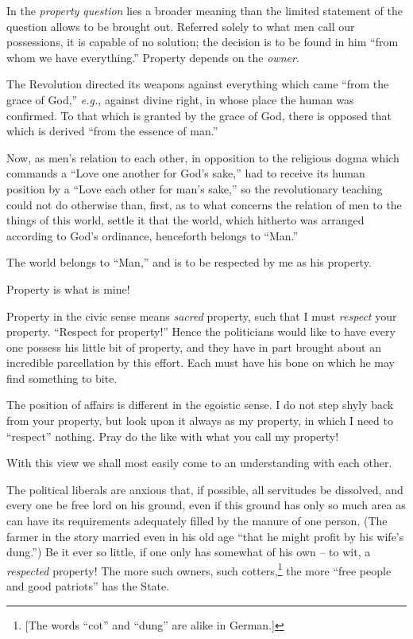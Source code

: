 \documentclass[12pt,a4paper]{book}
\begin{document}
In the \textit{property question} lies a broader meaning than the limited 
statement of the question allows to be brought out. Referred solely to what 
men call our possessions, it is capable of no solution; the decision is to be 
found in him ``from whom we have everything.'' Property depends on the 
\textit{owner}.

The Revolution directed its weapons against everything which came ``from the 
grace of God,'' \textit{e.g.}, against divine right, in whose place the 
human was confirmed. To that which is granted by the grace of God, there is 
opposed that which is derived ``from the essence of man.''

Now, as men's relation to each other, in opposition to the religious dogma 
which commands a ``Love one another for God's sake,'' had to receive its 
human position by a ``Love each other for man's sake,'' so the revolutionary 
teaching could not do otherwise than, first, as to what concerns the relation 
of men to the things of this world, settle it that the world, which hitherto 
was arranged according to God's ordinance, henceforth belongs to ``Man.''

The world belongs to ``Man,'' and is to be respected by me as his property.

Property is what is mine!

Property in the civic sense means \textit{sacred} property, such that I must 
\textit{respect} your property. ``Respect for property!'' Hence the 
politicians would like to have every one possess his little bit of property, 
and they have in part brought about an incredible parcellation by this effort. 
Each must have his bone on which he may find something to bite.

The position of affairs is different in the egoistic sense. I do not step 
shyly back from your property, but look upon it always as my property, in 
which I need to ``respect'' nothing. Pray do the like with what you call my 
property!

With this view we shall most easily come to an understanding with each other.

The political liberals are anxious that, if possible, all servitudes be 
dissolved, and every one be free lord on his ground, even if this ground has 
only so much area as can have its requirements adequately filled by the manure 
of one person. (The farmer in the story married even in his old age ``that he 
might profit by his wife's dung.'') Be it ever so little, if one only has 
somewhat of his own -- to wit, a \textit{respected} property! The more such 
owners, such cotters,\footnote{[The words ``cot'' and ``dung'' are alike 
in German.]} the more ``free people and good patriots'' has the State.
\end{document}

